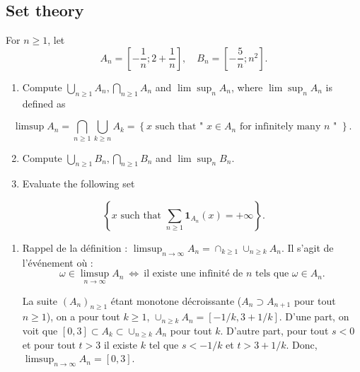 \begin{center}
    \section*{Set theory}
\end{center}

\begin{Exercise}
For $n \geq 1$, let
$$
A_{n}=\left[-\frac{1}{n} ; 2+\frac{1}{n}\right], \quad B_{n}=\left[-\frac{5}{n} ; n^{2}\right] .
$$
\begin{enumerate}
  \item Compute $\bigcup_{n \geq 1} A_{n}, \bigcap_{n \geq 1} A_{n}$ and $\lim \sup _{n} A_{n}$, where $\lim \sup _{n} A_{n}$ is defined as
\end{enumerate}
$$
\limsup A_{n}=\bigcap_{n \geq 1} \bigcup_{k \geq n} A_{k}=\left\{x \text { such that " } x \in A_{n} \text { for infinitely many } n \text { " }\right\} \text {. }
$$
\begin{enumerate}
  \setcounter{enumi}{1}
  \item Compute $\bigcup_{n \geq 1} B_{n}, \bigcap_{n \geq 1} B_{n}$ and $\lim \sup _{n} B_{n}$.

  \item Evaluate the following set

\end{enumerate}
$$
\left\{x \text { such that } \sum_{n \geq 1} \mathbf{1}_{A_{n}}(x)=+\infty\right\} .
$$
\end{Exercise}

\begin{solution}
  \begin{enumerate}
 \item 
 Rappel de la d\'efinition : $\limsup_{n \rightarrow \infty} A_{n} =\cap_{k\geq 1} \cup_{n\ge k} A_n$.
 Il s'agit de l'\'ev\'enement o\`u :
 $$\omega \in \limsup_{n \rightarrow \infty} A_{n}  \ \Longleftrightarrow \  \textrm{il existe une infinit\'e de  $n$ tels que } \omega \in A_{n}.$$
 
 La suite $(A_n)_{n\ge 1}$ \'etant monotone d\'ecroissante ($A_n \supset A_{n+1}$ pour tout $n\ge1$), on a pour tout $k\ge1$, $\cup_{n\ge k} A_n=[-1/k,3+1/k]$. D'une part, on voit que $[0,3]\subset A_k\subset \cup_{n\ge k} A_n$ pour tout $k$. D'autre part, pour tout $s<0$ et pour tout $t>3$ il existe $k$ tel que $s<-1/k$ et $t>3+1/k$. Donc, $\limsup_{n \rightarrow \infty} A_{n}=[0,3]$.
 \end{enumerate}
\end{solution}